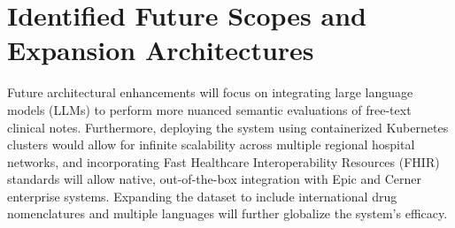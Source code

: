 \documentclass[12pt,a4paper]{report}
\begin{document}
\section{Identified Future Scopes and Expansion Architectures}
Future architectural enhancements will focus on integrating large language models (LLMs) to perform more nuanced semantic evaluations of free-text clinical notes. Furthermore, deploying the system using containerized Kubernetes clusters would allow for infinite scalability across multiple regional hospital networks, and incorporating Fast Healthcare Interoperability Resources (FHIR) standards will allow native, out-of-the-box integration with Epic and Cerner enterprise systems. Expanding the dataset to include international drug nomenclatures and multiple languages will further globalize the system's efficacy.
\end{document}
